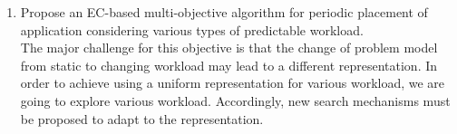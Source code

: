 \begin{enumerate}

	\item Propose an EC-based multi-objective algorithm for periodic placement of application considering various types of predictable workload. \\
	 The major challenge for this objective is that the change of problem model from static to changing workload may lead to a different representation. In order to achieve using a uniform representation for various workload, we are going to explore various workload. Accordingly, new search mechanisms must be proposed to adapt to the representation.


	

	

	\end{enumerate}

